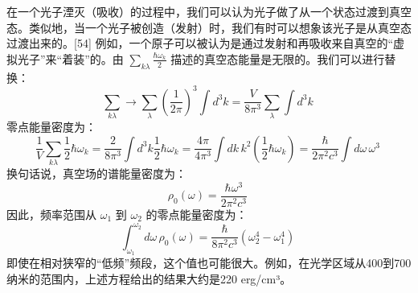 在一个光子湮灭（吸收）的过程中，我们可以认为光子做了从一个状态过渡到真空态。类似地，当一个光子被创造（发射）时，我们有时可以想象该光子是从真空态过渡出来的。[54] 例如，一个原子可以被认为是通过发射和再吸收来自真空的“虚拟光子”来“着装”的。由 \(\sum_{k\lambda} \frac{\hbar \omega_k}{2}\) 描述的真空态能量是无限的。我们可以进行替换：
\[
\sum_{k\lambda} \longrightarrow \sum_{\lambda} \left(\frac{1}{2\pi}\right)^3 \int d^3k = \frac{V}{8\pi^3} \sum_{\lambda} \int d^3k~
\]
零点能量密度为：
\[
\frac{1}{V} \sum_{k\lambda} \frac{1}{2} \hbar \omega_k = \frac{2}{8\pi^3} \int d^3k \frac{1}{2} \hbar \omega_k = \frac{4\pi}{4\pi^3} \int dk\, k^2 \left(\frac{1}{2} \hbar \omega_k \right) = \frac{\hbar}{2\pi^2 c^3} \int d\omega \, \omega^3~
\]
换句话说，真空场的谱能量密度为：
\[
\rho_0(\omega) = \frac{\hbar \omega^3}{2\pi^2 c^3}~
\]
因此，频率范围从 \(\omega_1\) 到 \(\omega_2\) 的零点能量密度为：
\[
\int_{\omega_1}^{\omega_2} d\omega \, \rho_0(\omega) = \frac{\hbar}{8\pi^2 c^3} \left(\omega_2^4 - \omega_1^4\right)~
\]
即使在相对狭窄的“低频”频段，这个值也可能很大。例如，在光学区域从400到700纳米的范围内，上述方程给出的结果大约是220 erg/cm³。

